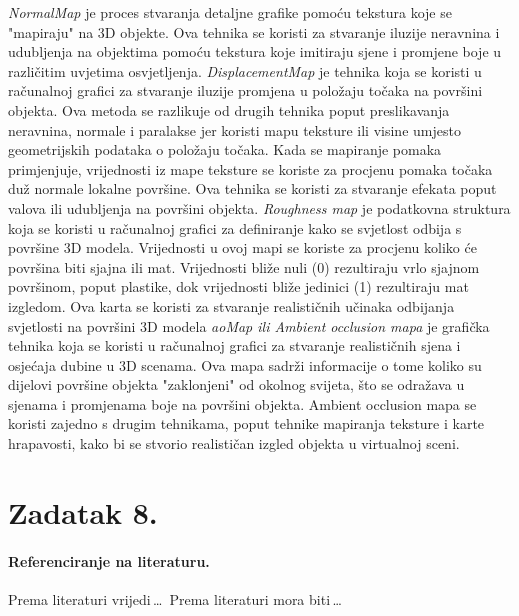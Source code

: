 \documentclass[a4paper,12pt]{article}
\begin{document}
\textit{NormalMap} je proces stvaranja detaljne grafike pomoću tekstura koje se "mapiraju" na 3D objekte. Ova tehnika se koristi za stvaranje iluzije neravnina i udubljenja na objektima pomoću tekstura koje imitiraju sjene i promjene boje u različitim uvjetima osvjetljenja.
\newline \textit{DisplacementMap} je tehnika koja se koristi u računalnoj grafici za stvaranje iluzije promjena u položaju točaka na površini objekta. Ova metoda se razlikuje od drugih tehnika poput preslikavanja neravnina, normale i paralakse jer koristi mapu teksture ili visine
umjesto geometrijskih podataka o položaju točaka. Kada se mapiranje pomaka primjenjuje, vrijednosti iz mape teksture se koriste za procjenu pomaka točaka duž normale lokalne površine. Ova tehnika se koristi za stvaranje efekata poput valova ili udubljenja na površini objekta.
\pagebreak
\textit{Roughness map} je podatkovna struktura koja se koristi u računalnoj grafici za definiranje kako se svjetlost odbija s površine 3D modela. Vrijednosti u ovoj mapi se koriste za procjenu koliko će površina biti sjajna ili mat. Vrijednosti bliže nuli (0) rezultiraju vrlo sjajnom površinom, 
poput plastike, dok vrijednosti bliže jedinici (1) rezultiraju mat izgledom. Ova karta se koristi za stvaranje realističnih učinaka odbijanja svjetlosti na površini 3D modela
\newline \textit{aoMap ili Ambient occlusion mapa} je grafička tehnika koja se koristi u računalnoj grafici za stvaranje realističnih sjena i osjećaja dubine u 3D scenama. Ova mapa sadrži informacije o tome koliko su dijelovi površine objekta "zaklonjeni" od okolnog svijeta, što se odražava u sjenama i promjenama boje na površini objekta. 
Ambient occlusion mapa se koristi zajedno s drugim tehnikama, poput tehnike mapiranja teksture i karte hrapavosti, kako bi se stvorio realističan izgled objekta u virtualnoj sceni.
\pagebreak
\section{Zadatak 8.}
\pagebreak

\paragraph{Referenciranje na literaturu.} Prema literaturi \cite{Maric} vrijedi\,\ldots \ Prema literaturi \cite{geo} mora biti\,\ldots
\end{document}

